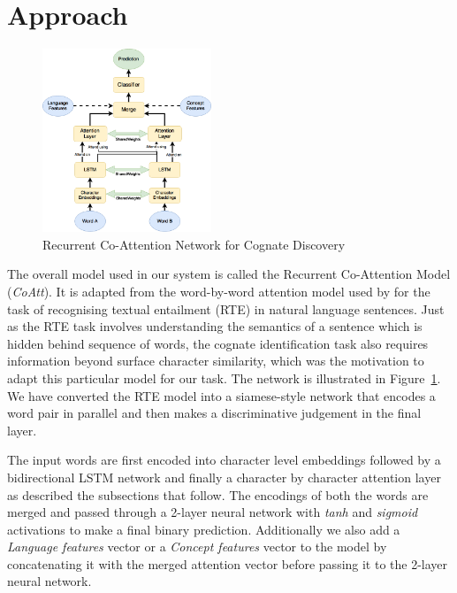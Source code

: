 \documentclass[11pt,letterpaper]{article}
\begin{document}

\section{Approach}

\begin{figure}[t]
	\centering
	\includegraphics[width=0.45\textwidth]{CoAttNetwork}
    \caption{Recurrent Co-Attention Network for Cognate Discovery}
    \label{CoAttNet}
\end{figure}

The overall model used in our system is called the Recurrent Co-Attention Model (\textit{CoAtt}). It is adapted from the word-by-word attention model used by \cite{rocktaschel2016reasoning} for the task of recognising textual entailment (RTE) in natural language sentences. Just as the RTE task involves understanding the semantics of a sentence which is hidden behind sequence of words, the cognate identification task also requires information beyond surface character similarity, which was the motivation to adapt this particular model for our task. The network is illustrated in Figure~\ref{CoAttNet}. We have converted the RTE model into a siamese-style network that encodes a word pair in parallel and then makes a discriminative judgement in the final layer. 

The input words are first encoded into character level embeddings followed by a bidirectional LSTM network and finally a character by character attention layer as described the subsections that follow. The encodings of both the words are merged and passed through a 2-layer neural network with \textit{tanh} and \textit{sigmoid} activations to make a final binary prediction. Additionally we also add a \textit{Language features} vector or a \textit{Concept features} vector to the model by concatenating it with the merged attention vector before passing it to the 2-layer neural network.
\end{document}

